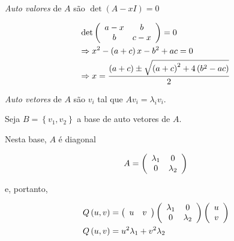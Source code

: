 \documentclass[11pt, oneside, a4paper]{gsm-l}
\begin{document}
\textit{Auto valores} de $A$ são $\det \left( {A - xI} \right) = 0$

\[
\begin{gathered}
\det \left( {\begin{array}{*{20}c}
{a - x} & b  \\
b & {c - x}  \\

\end{array} } \right) = 0 \hfill \\
\Rightarrow x^2  - \left( {a + c} \right)x - b^2  + ac = 0 \hfill \\
   \Rightarrow x = \frac{{\left( {a + c} \right) \pm \sqrt {\left( {a + c} \right)^2  + 4\left( {b^2  - ac} \right)} }}
{2} \hfill \\
\end{gathered}
\]

\textit{Auto vetores} de $A$ são $v_i$ tal que $Av_i  = \lambda _i v_i$.

Seja $B = \left\{ {v_1 ,v_2 } \right\}$ a base de auto vetores de $A$.

Nesta base, $A$ é diagonal

\[
A = \left( {\begin{array}{*{20}c}
{\lambda _1 } & 0  \\
0 & {\lambda _2 }  \\

\end{array} } \right)
\]

e, portanto,

\[
\begin{gathered}
Q\left( {u,v} \right) = \left( {\begin{array}{*{20}c}
u & v  \\

\end{array} } \right)\left( {\begin{array}{*{20}c}
{\lambda _1 } & 0  \\
0 & {\lambda _2 }  \\

\end{array} } \right)\left( {\begin{array}{*{20}c}
u  \\
v  \\

\end{array} } \right) \hfill \\
Q\left( {u,v} \right) = u^2 \lambda _1  + v^2 \lambda _2  \hfill \\
\end{gathered}
\]
\end{document}
